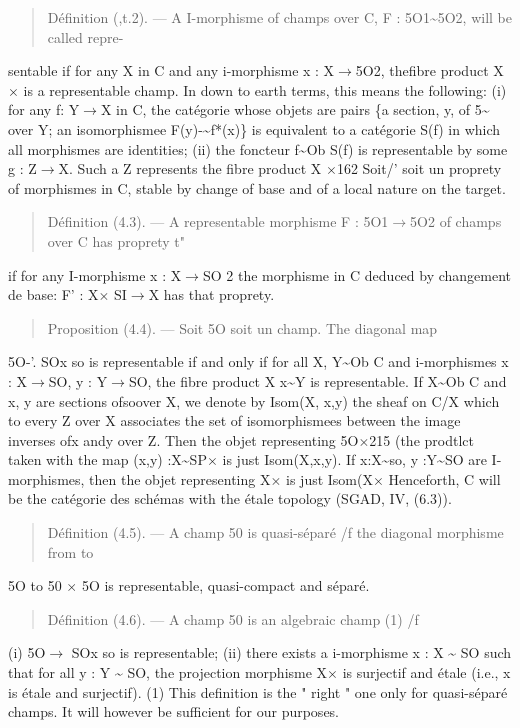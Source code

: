 \documentclass[11pt]{article}
\theoremstyle{plain}
\theoremstyle{definition}
\theoremstyle{remark}
\begin{document}
\begin{quote}D\'efinition (,t.2). --- A I-morphisme of champs over C, F : 5O1\textasciitilde{}5O2, will be called repre-\end{quote}
sentable if for any X in C and any i-morphisme x : X$\to$5O2, thefibre product X$\times$ is a representable champ. In down to earth terms, this means the following: (i) for any f: Y$\to$X in C, the cat\'egorie whose objets are pairs \{a section, y, of 5\textasciitilde{} over Y; an isomorphismee F(y)-\textasciitilde{}f*(x)\} is equivalent to a cat\'egorie S(f) in which all morphismes are identities; (ii) the foncteur f\textasciitilde{}Ob S(f) is representable by some g : Z$\to$X. Such a Z represents the fibre product X $\times$162 Soit/' soit un proprety of morphismes in C, stable by change of base and of a local nature on the target.

\begin{quote}D\'efinition (4.3). --- A representable morphisme F : 5O1$\to$5O2 of champs over C has proprety t"\end{quote}
if for any I-morphisme x : X$\to$SO 2 the morphisme in C deduced by changement de base: F' : X$\times$ SI$\to$X has that proprety.

\begin{quote}Proposition (4.4). --- Soit 5O soit un champ. The diagonal map\end{quote}
5O-'. SOx so is representable if and only if for all X, Y\textasciitilde{}Ob C and i-morphismes x : X$\to$SO, y : Y$\to$SO, the fibre product X x\textasciitilde{}Y is representable. If X\textasciitilde{}Ob C and x, y are sections ofsoover X, we denote by Isom(X, x,y) the sheaf on C/X which to every Z over X associates the set of isomorphismees between the image inverses ofx andy over Z. Then the objet representing 5O$\times$215 (the prodtlct taken with the map (x,y) :X\textasciitilde{}SP$\times$ is just Isom(X,x,y). If x:X\textasciitilde{}so, y :Y\textasciitilde{}SO are I-morphismes, then the objet representing X$\times$ is just Isom(X$\times$ Henceforth, C will be the cat\'egorie des sch\'emas with the \'etale topology (SGAD, IV, (6.3)).

\begin{quote}D\'efinition (4.5). --- A champ 50 is quasi-s\'epar\'e /f the diagonal morphisme from to\end{quote}
5O to 50 $\times$ 5O is representable, quasi-compact and s\'epar\'e.

\begin{quote}D\'efinition (4.6). --- A champ 50 is an algebraic champ (1) /f\end{quote}
(i) 5O$\to$ SOx so is representable; (ii) there exists a i-morphisme x : X \textasciitilde{} SO such that for all y : Y \textasciitilde{} SO, the projection morphisme X$\times$ is surjectif and \'etale (i.e., x is \'etale and surjectif). (1) This definition is the " right " one only for quasi-s\'epar\'e champs. It will however be sufficient for our purposes.
\end{document}
